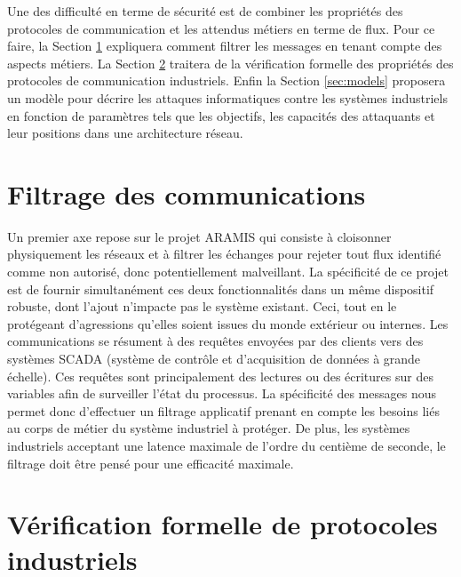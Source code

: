 \documentclass{article}
\newcommand{\aramis}{ARAMIS}
\begin{document}
Une des difficulté en terme de sécurité est de combiner les propriétés des
protocoles de communication et les attendus métiers en terme de flux.
Pour ce faire, la Section \ref{sec:aramis} expliquera comment filtrer les
messages en tenant compte des aspects métiers.
La Section \ref{sec:protocols} traitera de la vérification formelle des
propriétés des protocoles de communication industriels.
Enfin la Section \ref{sec:models} proposera un modèle pour décrire les attaques
informatiques contre les systèmes industriels en fonction de paramètres tels que
les objectifs, les capacités des attaquants et leur positions dans une
architecture réseau.

\section{Filtrage des communications}\label{sec:aramis}

Un premier axe repose sur le projet \aramis{} \cite{aramis} qui consiste à
cloisonner physiquement les réseaux et à filtrer les échanges pour rejeter tout
flux identifié comme non autorisé, donc potentiellement malveillant.
La spécificité de ce projet est de fournir simultanément ces deux
fonctionnalités dans un même dispositif robuste, dont l'ajout n'impacte pas le
système existant.
Ceci, tout en le protégeant d'agressions qu'elles soient issues du monde
extérieur ou internes.
Les communications se résument à des requêtes envoyées par des clients vers des
systèmes SCADA (système de contrôle et d'acquisition de données à grande
échelle).
Ces requêtes sont principalement des lectures ou des écritures sur des variables
afin de surveiller l'état du processus.
La spécificité des messages nous permet donc d'effectuer un filtrage applicatif
prenant en compte les besoins liés au corps de métier du système industriel à
protéger.
De plus, les systèmes industriels acceptant une latence maximale de l'ordre du
centième de seconde, le filtrage doit être pensé pour une efficacité maximale.

%        

\section{Vérification formelle de protocoles industriels}\label{sec:protocols}
\end{document}
